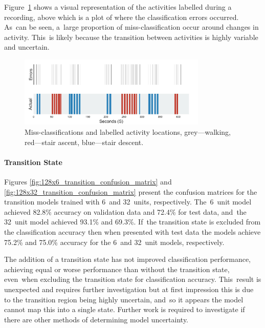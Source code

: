 Figure~\ref{fig:missclassification} shows a visual representation of the activities labelled during a recording, above which is a plot of where the classification errors occurred. As~can be seen, a~large proportion of miss-classification occur around changes in activity. This~is likely because the transition between activities is highly variable and uncertain.

\begin{figure}[!hbt]
    \centering
    \includegraphics[width=0.8\textwidth]{content/4-LSTM_Behaviour/results/location_of_errors.jpg}
    \caption{Miss-classifications and labelled activity locations, grey---walking, red---stair ascent, blue---stair descent.}
    \label{fig:missclassification}
\end{figure}


\paragraph{Transition State}
Figures \ref{fig:128x6_transition_confusion_matrix} and \ref{fig:128x32_transition_confusion_matrix} present the confusion matrices for the transition models trained with 6~and 32~units, respectively. The~6~unit model achieved 82.8\% accuracy on validation data and 72.4\% for test data, and~the 32~unit model achieved 93.1\% and 69.3\%. If~the transition state is excluded from the classification accuracy then when presented with test data the models achieve 75.2\% and 75.0\% accuracy for the 6~and 32~unit models, respectively.%

The addition of a transition state has not improved classification performance, achieving equal or worse performance than without the transition state, even~when excluding the transition state for classification accuracy. This~result is unexpected and requires further investigation but at first impression this is due to the transition region being highly uncertain, and~so it appears the model cannot map this into a single state. Further work is required to investigate if there are other methods of determining model uncertainty.

